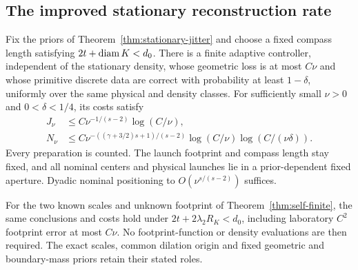 \subsection{The improved stationary reconstruction rate}
\begin{theorem}
\label{thm:rare-stationary}
Fix the priors of Theorem~\ref{thm:stationary-jitter} and choose a
fixed compass length satisfying $2t+\operatorname{diam} K<d_0$. There is a finite
adaptive controller, independent of the stationary density, whose
geometric loss is at most $C\nu$ and whose primitive discrete data
are correct with probability at least $1-\delta$, uniformly over the
same physical and density classes. For sufficiently small $\nu>0$
and $0<\delta<1/4$, its costs satisfy
\begin{align}
 J_\nu&\le C\nu^{-1/(s-2)}\log(C/\nu),
                                      \label{eq:rare-centers}\\
 N_\nu&\le C\nu^{-((\gamma+3/2)s+1)/(s-2)}
              \log(C/\nu)\log(C/(\nu\delta)).
                                      \label{eq:rare-attempts}
\end{align}
Every preparation is counted. The launch footprint and compass length
stay fixed, and all nominal centers and physical launches lie in a
prior-dependent fixed aperture. Dyadic nominal positioning to
$O(\nu^{s/(s-2)})$ suffices.

For the two known scales and unknown footprint of
Theorem~\ref{thm:self-finite}, the same conclusions and costs hold
under $2t+2\lambda_2R_K<d_0$, including laboratory $C^2$ footprint
error at most $C\nu$. No footprint-function or density evaluations
are then required. The exact scales, common dilation origin and fixed
geometric and boundary-mass priors retain their stated roles.
\end{theorem}
